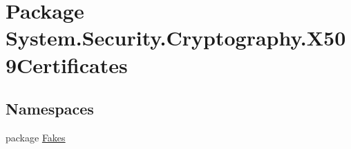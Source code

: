 \hypertarget{namespace_system_1_1_security_1_1_cryptography_1_1_x509_certificates}{\section{Package System.\-Security.\-Cryptography.\-X509\-Certificates}
\label{namespace_system_1_1_security_1_1_cryptography_1_1_x509_certificates}
}
\subsection*{Namespaces}
\begin{DoxyCompactItemize}
\item 
package \hyperlink{namespace_system_1_1_security_1_1_cryptography_1_1_x509_certificates_1_1_fakes}{Fakes}
\end{DoxyCompactItemize}
